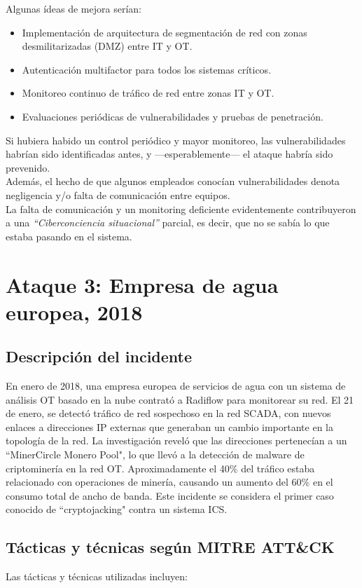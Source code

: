 Algunas ídeas de mejora serían:
\begin{itemize}
    \item Implementación de arquitectura de segmentación de red con zonas desmilitarizadas (DMZ) entre IT y OT.
    \item Autenticación multifactor para todos los sistemas críticos.
    \item Monitoreo continuo de tráfico de red entre zonas IT y OT.
    \item Evaluaciones periódicas de vulnerabilidades y pruebas de penetración.
\end{itemize}

Si hubiera habido un control periódico y mayor monitoreo, las vulnerabilidades habrían sido identificadas antes, y ---esperablemente--- el ataque habría sido prevenido.\\
Además, el hecho de que algunos empleados conocían vulnerabilidades denota negligencia y/o falta de comunicación entre equipos.\\
La falta de comunicación y un monitoring deficiente evidentemente contribuyeron a una \textit{``Ciberconciencia situacional''} parcial, es decir, que no se sabía lo que estaba pasando en el sistema.

\section{Ataque 3: Empresa de agua europea, 2018}

\subsection{Descripción del incidente}
En enero de 2018, una empresa europea de servicios de agua con un sistema de análisis OT basado en la nube contrató a Radiflow para monitorear su red. El 21 de enero, se detectó tráfico de red sospechoso en la red SCADA, con nuevos enlaces a direcciones IP externas que generaban un cambio importante en la topología de la red. La investigación reveló que las direcciones pertenecían a un ``MinerCircle Monero Pool", lo que llevó a la detección de malware de criptominería en la red OT. Aproximadamente el 40\% del tráfico estaba relacionado con operaciones de minería, causando un aumento del 60\% en el consumo total de ancho de banda. Este incidente se considera el primer caso conocido de ``cryptojacking" contra un sistema ICS.

\subsection{Tácticas y técnicas según MITRE ATT\&CK}
Las tácticas y técnicas utilizadas incluyen:

